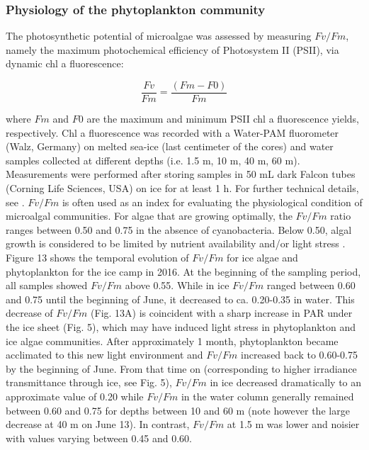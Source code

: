 \documentclass[essd, manuscript]{copernicus}
\begin{document}
\subsubsection{Physiology of the phytoplankton community}

The photosynthetic potential of microalgae was assessed by measuring $Fv/Fm$, namely the maximum photochemical efficiency of Photosystem II (PSII), via dynamic chl a fluorescence:

\begin{equation}
	\frac{Fv}{Fm} = \frac{(Fm - F0)}{Fm}
\end{equation}

\noindent where $Fm$ and $F0$ are the maximum and minimum PSII chl a fluorescence yields, respectively. Chl a fluorescence was recorded with a Water-PAM fluorometer (Walz, Germany) on melted sea-ice (last centimeter of the cores) and water samples collected at different depths (i.e. 1.5 m, 10 m, 40 m, 60 m). Measurements were performed after storing samples in 50 mL dark Falcon tubes (Corning Life Sciences, USA) on ice for at least 1 h. For further technical details, see \citet{Galindo2017}. $Fv/Fm$ is often used as an index for evaluating the physiological condition of microalgal communities.  For algae that are growing optimally, the $Fv/Fm$ ratio ranges between 0.50 and 0.75 in the absence of cyanobacteria. Below 0.50, algal growth is considered to be limited by nutrient availability and/or light stress \citep{Suggett2010}. Figure 13 shows the temporal evolution of $Fv/Fm$ for ice algae and phytoplankton for the ice camp in 2016. At the beginning of the sampling period, all samples showed $Fv/Fm$ above 0.55. While in ice $Fv/Fm$ ranged between 0.60 and 0.75 until the beginning of June, it decreased to ca. 0.20-0.35 in water. This decrease of $Fv/Fm$ (Fig. 13A) is coincident with a sharp increase in PAR under the ice sheet (Fig. 5), which may have induced light stress in phytoplankton and ice algae communities. After approximately 1 month, phytoplankton became acclimated to this new light environment and $Fv/Fm$ increased back to 0.60-0.75 by the beginning of June. From that time on (corresponding to higher irradiance transmittance through ice, see Fig. 5), $Fv/Fm$ in ice decreased dramatically to an approximate value of 0.20 while $Fv/Fm$ in the water column generally remained between 0.60 and 0.75 for depths between 10 and 60 m (note however the large decrease at 40 m on June 13). In contrast, $Fv/Fm$ at 1.5 m was lower and noisier with values varying between 0.45 and 0.60.
\end{document}
